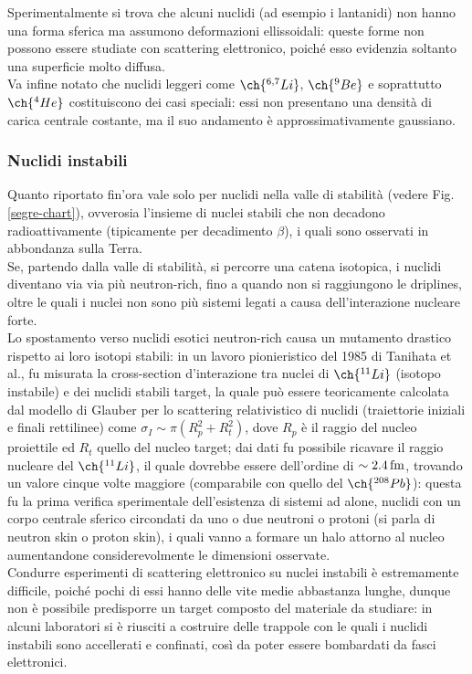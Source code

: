 Sperimentalmente si trova che alcuni nuclidi (ad esempio i lantanidi) non hanno una forma sferica ma assumono deformazioni ellissoidali: queste forme non possono essere studiate con scattering elettronico, poiché esso evidenzia soltanto una superficie molto diffusa.\\
Va infine notato che nuclidi leggeri come $ \ch{^{6,7}Li} $, $ \ch{^{9}Be} $ e soprattutto $ \ch{^{4}He} $ costituiscono dei casi speciali: essi non presentano una densità di carica centrale costante, ma il suo andamento è approssimativamente gaussiano.

\subsubsection{Nuclidi instabili}

Quanto riportato fin'ora vale solo per nuclidi nella valle di stabilità (vedere Fig. \ref{segre-chart}), ovverosia l'insieme di nuclei stabili che non decadono radioattivamente (tipicamente per decadimento $ \beta $), i quali sono osservati in abbondanza sulla Terra.\\
Se, partendo dalla valle di stabilità, si percorre una catena isotopica, i nuclidi diventano via via più neutron-rich, fino a quando non si raggiungono le driplines, oltre le quali i nuclei non sono più sistemi legati a causa dell'interazione nucleare forte.\\
Lo spostamento verso nuclidi esotici neutron-rich causa un mutamento drastico rispetto ai loro isotopi stabili: in un lavoro pionieristico del 1985 di Tanihata et al., fu misurata la cross-section d'interazione tra nuclei di $ \ch{^{11}Li} $ (isotopo instabile) e dei nuclidi stabili target, la quale può essere teoricamente calcolata dal modello di Glauber per lo scattering relativistico di nuclidi (traiettorie iniziali e finali rettilinee) come $ \sigma_I \sim \pi \left( R_p^2 + R_t^2 \right) $, dove $ R_p $ è il raggio del nucleo proiettile ed $ R_t $ quello del nucleo target; dai dati fu possibile ricavare il raggio nucleare del $ \ch{^{11}Li} $, il quale dovrebbe essere dell'ordine di $ \sim 2.4\,\text{fm} $, trovando un valore cinque volte maggiore (comparabile con quello del $ \ch{^{208}Pb} $): questa fu la prima verifica sperimentale dell'esistenza di sistemi ad alone, nuclidi con un corpo centrale sferico circondati da uno o due neutroni o protoni (si parla di neutron skin o proton skin), i quali vanno a formare un halo attorno al nucleo aumentandone considerevolmente le dimensioni osservate.\\
Condurre esperimenti di scattering elettronico su nuclei instabili è estremamente difficile, poiché pochi di essi hanno delle vite medie abbastanza lunghe, dunque non è possibile predisporre un target composto del materiale da studiare: in alcuni laboratori si è riusciti a costruire delle trappole con le quali i nuclidi instabili sono accellerati e confinati, così da poter essere bombardati da fasci elettronici.

